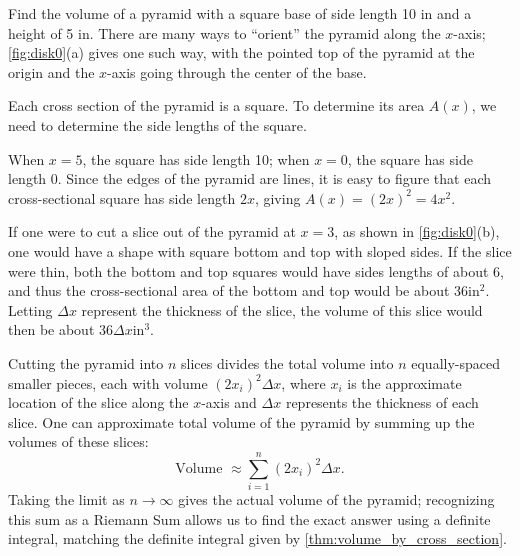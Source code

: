 \begin{example}\label{ex_disk0}%
Find the volume of a pyramid with a square base of side length 10 in and a height of 5 in.
\solution
There are many ways to ``orient'' the pyramid along the $x$-axis; \autoref{fig:disk0}(a) gives one such way, with the pointed top of the pyramid at the origin and the $x$-axis going through the center of the base.

Each cross section of the pyramid is a square.
To determine its area $A(x)$, we need to determine the side lengths of the square.

When $x=5$, the square has side length 10; when $x=0$, the square has side length 0. Since the edges of the pyramid are lines, it is easy to figure that each cross-sectional square has side length $2x$, giving $A(x) = (2x)^2=4x^2$.

If one were to cut a slice out of the pyramid at $x=3$, as shown in \autoref{fig:disk0}(b), one would have a shape with square bottom and top with sloped sides. If the slice were thin, both the bottom and top squares would have sides lengths of about 6, and thus the cross-sectional area of the bottom and top would be about 36in$^2$. Letting $\Delta x$ represent the thickness of the slice, the volume of this slice would then be about $36\Delta x$in$^3$. 

Cutting the pyramid into $n$ slices divides the total volume into $n$ equally-spaced smaller pieces, each with volume $(2x_i)^2\Delta x$, where $x_i$ is the approximate location of the slice along the $x$-axis and $\Delta x$ represents the thickness of each slice. One can approximate total volume of the pyramid by summing up the volumes of these slices:
\[\text{Volume } \approx \sum_{i=1}^n (2x_i)^2\Delta x.\]
Taking the limit as $n\to\infty$ gives the actual volume of the pyramid; recognizing this sum as a Riemann Sum allows us to find the exact answer using a definite integral, matching the definite integral given by \autoref{thm:volume_by_cross_section}.


\end{example}
